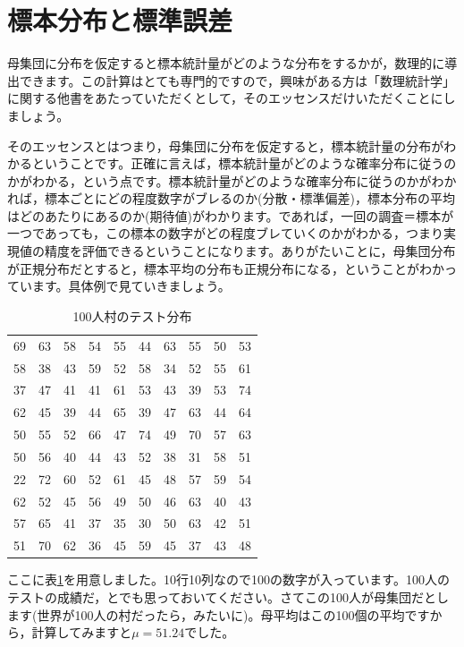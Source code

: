 \documentclass{ltjsbook}
\begin{document}
\section{標本分布と標準誤差}
母集団に分布を仮定すると標本統計量がどのような分布をするかが，数理的に導出できます。この計算はとても専門的ですので，興味がある方は「数理統計学」に関する他書をあたっていただくとして，そのエッセンスだけいただくことにしましょう。

そのエッセンスとはつまり，母集団に分布を仮定すると，標本統計量の分布がわかるということです。正確に言えば，標本統計量がどのような確率分布に従うのかがわかる，という点です。標本統計量がどのような確率分布に従うのかがわかれば，標本ごとにどの程度数字がブレるのか(分散・標準偏差)，標本分布の平均はどのあたりにあるのか(期待値)がわかります。であれば，一回の調査＝標本が一つであっても，この標本の数字がどの程度ブレていくのかがわかる，つまり実現値の精度を評価できるということになります。ありがたいことに，母集団分布が正規分布だとすると，標本平均の分布も正規分布になる，ということがわかっています。具体例で見ていきましょう。

\begin{table}[ht]
    \centering
    \caption{100人村のテスト分布}
    \begin{tabular}{rrrrrrrrrr}
      \hline
    69 & 63 & 58 & 54 & 55 & 44 & 63 & 55 & 50 & 53 \\ 
      58 & 38 & 43 & 59 & 52 & 58 & 34 & 52 & 55 & 61 \\ 
      37 & 47 & 41 & 41 & 61 & 53 & 43 & 39 & 53 & 74 \\ 
      62 & 45 & 39 & 44 & 65 & 39 & 47 & 63 & 44 & 64 \\ 
      50 & 55 & 52 & 66 & 47 & 74 & 49 & 70 & 57 & 63 \\ 
      50 & 56 & 40 & 44 & 43 & 52 & 38 & 31 & 58 & 51 \\ 
      22 & 72 & 60 & 52 & 61 & 45 & 48 & 57 & 59 & 54 \\ 
      62 & 52 & 45 & 56 & 49 & 50 & 46 & 63 & 40 & 43 \\ 
      57 & 65 & 41 & 37 & 35 & 30 & 50 & 63 & 42 & 51 \\ 
      51 & 70 & 62 & 36 & 45 & 59 & 45 & 37 & 43 & 48 \\ 
       \hline
    \end{tabular}
    \label{tbl::16_01}
    \end{table}

ここに表\ref{tbl::16_01}を用意しました。10行10列なので100の数字が入っています。100人のテストの成績だ，とでも思っておいてください。さてこの100人が母集団だとします(世界が100人の村だったら，みたいに)。母平均はこの100個の平均ですから，計算してみますと$\mu=51.24$でした。
\end{document}

